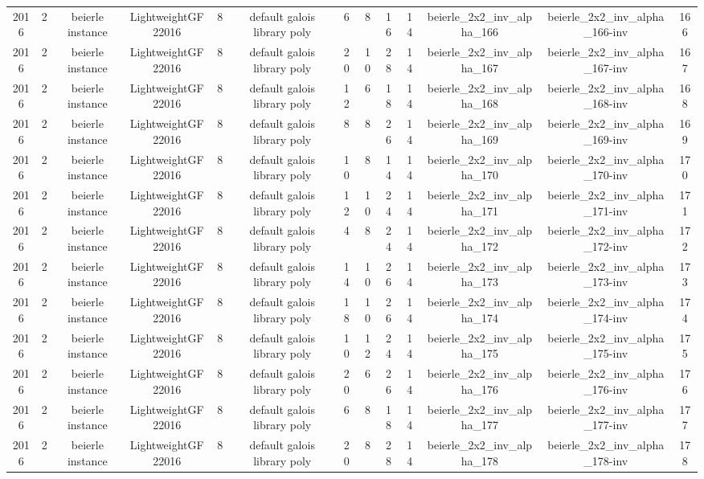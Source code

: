 \begin{tabular}{c c c c c c c c c c c c c}
2016 & 2 & beierle instance & LightweightGF22016 & 8 & default galois library poly & 6 & 8 & 16 & 14 & beierle_2x2_inv_alpha_166 & beierle_2x2_inv_alpha_166-inv & 166 \\
2016 & 2 & beierle instance & LightweightGF22016 & 8 & default galois library poly & 20 & 10 & 28 & 14 & beierle_2x2_inv_alpha_167 & beierle_2x2_inv_alpha_167-inv & 167 \\
2016 & 2 & beierle instance & LightweightGF22016 & 8 & default galois library poly & 12 & 6 & 18 & 14 & beierle_2x2_inv_alpha_168 & beierle_2x2_inv_alpha_168-inv & 168 \\
2016 & 2 & beierle instance & LightweightGF22016 & 8 & default galois library poly & 8 & 8 & 26 & 14 & beierle_2x2_inv_alpha_169 & beierle_2x2_inv_alpha_169-inv & 169 \\
2016 & 2 & beierle instance & LightweightGF22016 & 8 & default galois library poly & 10 & 8 & 14 & 14 & beierle_2x2_inv_alpha_170 & beierle_2x2_inv_alpha_170-inv & 170 \\
2016 & 2 & beierle instance & LightweightGF22016 & 8 & default galois library poly & 12 & 10 & 24 & 14 & beierle_2x2_inv_alpha_171 & beierle_2x2_inv_alpha_171-inv & 171 \\
2016 & 2 & beierle instance & LightweightGF22016 & 8 & default galois library poly & 4 & 8 & 24 & 14 & beierle_2x2_inv_alpha_172 & beierle_2x2_inv_alpha_172-inv & 172 \\
2016 & 2 & beierle instance & LightweightGF22016 & 8 & default galois library poly & 14 & 10 & 26 & 14 & beierle_2x2_inv_alpha_173 & beierle_2x2_inv_alpha_173-inv & 173 \\
2016 & 2 & beierle instance & LightweightGF22016 & 8 & default galois library poly & 18 & 10 & 26 & 14 & beierle_2x2_inv_alpha_174 & beierle_2x2_inv_alpha_174-inv & 174 \\
2016 & 2 & beierle instance & LightweightGF22016 & 8 & default galois library poly & 10 & 12 & 24 & 14 & beierle_2x2_inv_alpha_175 & beierle_2x2_inv_alpha_175-inv & 175 \\
2016 & 2 & beierle instance & LightweightGF22016 & 8 & default galois library poly & 20 & 6 & 26 & 14 & beierle_2x2_inv_alpha_176 & beierle_2x2_inv_alpha_176-inv & 176 \\
2016 & 2 & beierle instance & LightweightGF22016 & 8 & default galois library poly & 6 & 8 & 18 & 14 & beierle_2x2_inv_alpha_177 & beierle_2x2_inv_alpha_177-inv & 177 \\
2016 & 2 & beierle instance & LightweightGF22016 & 8 & default galois library poly & 20 & 8 & 28 & 14 & beierle_2x2_inv_alpha_178 & beierle_2x2_inv_alpha_178-inv & 178 \\

\end{tabular}

